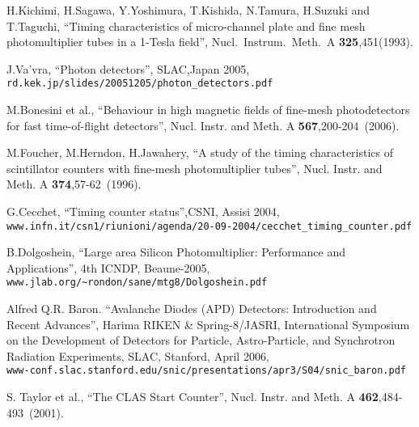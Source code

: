 \begin{thebibliography}{99}
 H.Kichimi, H.Sagawa, Y.Yoshimura, T.Kishida, N.Tamura,
 H.Suzuki and T.Taguchi,
 ``Timing characteristics of micro-channel plate and fine mesh photomultiplier
 tubes in a 1-Tesla field'', Nucl.\ Instrum.\ Meth.\ A {\bf 325},451(1993).

 J.Va'vra, ``Photon detectors'', SLAC,Japan 2005,\\ 
\verb|rd.kek.jp/slides/20051205/photon_detectors.pdf|



 M.Bonesini et al., ``Behaviour in high magnetic fields of fine-mesh photodetectors for fast time-of-flight detectors'',
  Nucl. Instr. and Meth. A \textbf{567},200-204~(2006).




 M.Foucher, M.Herndon, H.Jawahery, 
``A study of the timing characteristics of scintillator counters with fine-mesh photomultiplier tubes'',
 Nucl. Instr. and Meth. A \textbf{374},57-62~(1996).


 G.Cecchet,  ``Timing counter status'',CSNI, Assisi 2004,\\
\verb|www.infn.it/csn1/riunioni/agenda/20-09-2004/cecchet_timing_counter.pdf|





 B.Dolgoshein, ``Large area Silicon Photomultiplier: Performance and Applications'',
4th ICNDP, Beaune-2005,\\
 \verb|www.jlab.org/~rondon/sane/mtg8/Dolgoshein.pdf|

 Alfred Q.R. Baron.    ``Avalanche Diodes (APD) Detectors: Introduction and Recent Advances'',
Harima RIKEN \& Spring-8/JASRI, International Symposium on the Development of Detectors
for Particle, Astro-Particle, and Synchrotron Radiation Experiments, SLAC, Stanford, April 2006,\\
\verb|www-conf.slac.stanford.edu/snic/presentations/apr3/S04/snic_baron.pdf|





 S. Taylor et al., ``The CLAS Start Counter'', Nucl. Instr. and Meth. A \textbf{462},484-493~(2001).


\end{thebibliography}

